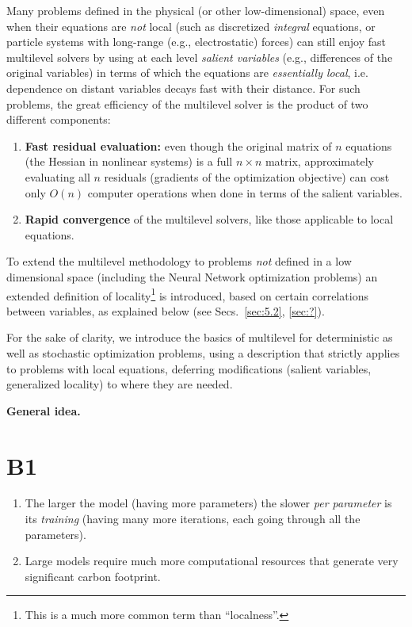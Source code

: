 \documentclass{article} %
\begin{document}
Many problems defined in the physical (or other low-dimensional) space, even when their equations are {\it not} local (such as discretized {\it integral} equations, or particle systems with long-range (e.g., electrostatic) forces) can still enjoy fast multilevel solvers by using at each level {\it salient variables} (e.g., differences of the original variables) in terms of which the equations are {\it essentially local}, i.e. dependence on distant variables decays fast with their distance. For such problems, the great efficiency of the multilevel solver is the product of two different components:
\begin{enumerate}
    \item[(1)] {\bf Fast residual evaluation:} even though the original matrix of $n$ equations (the Hessian in nonlinear systems) is a full $n \times n$ matrix, approximately evaluating all $n$ residuals (gradients of the optimization objective) can cost only $O(n)$ computer operations when done in terms of the salient variables.
    \item[(2)] {\bf Rapid convergence} of the multilevel solvers, like those applicable to local equations.
\end{enumerate}
To extend the multilevel methodology to problems {\it not} defined in a low dimensional space (including the Neural Network optimization problems) an extended definition of locality\footnote{This is a much more common term than ``localness''.} is introduced, based on certain correlations between variables, as explained below (see Secs.~\ref{sec:5.2}, \ref{sec:?}).

For the sake of clarity, we introduce the basics of multilevel for deterministic as well as stochastic optimization problems, using a description that strictly applies to problems with local equations, deferring modifications (salient variables, generalized locality) to where they are needed.

{\bf General idea.}

\section{B1}
\begin{enumerate}
    \item The larger the model (having more parameters) the slower {\it per parameter} is its {\it training} (having many more iterations, each going through all the parameters).
    \item Large models require much more computational resources that generate very significant carbon footprint.
\end{enumerate}
\end{document}
